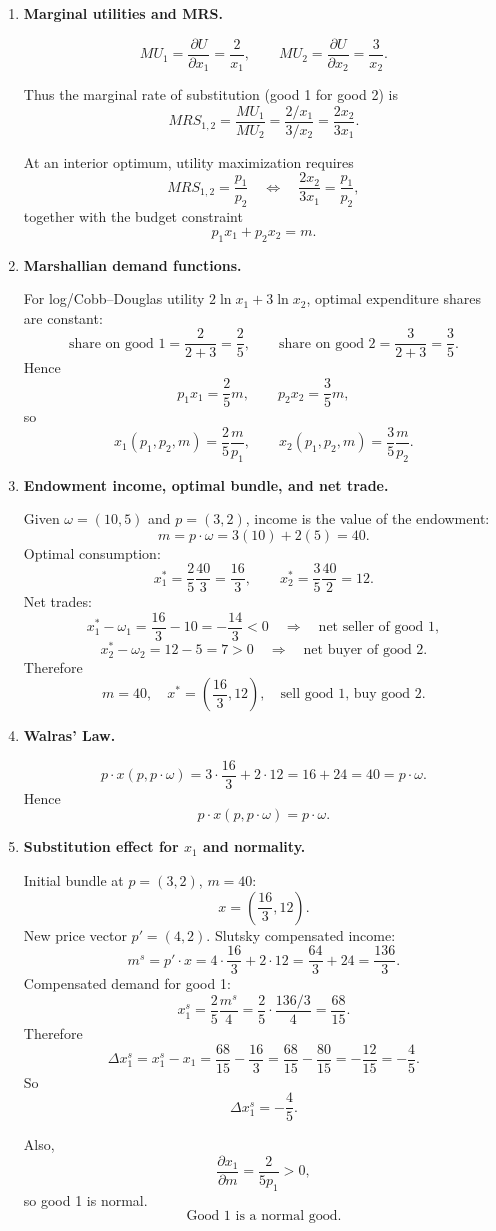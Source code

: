 \documentclass[12pt]{article}
\begin{document}
\begin{enumerate}[label=(\alph*)]
\item \textbf{Marginal utilities and MRS.}

\[
MU_1=\frac{\partial U}{\partial x_1}=\frac{2}{x_1},\qquad
MU_2=\frac{\partial U}{\partial x_2}=\frac{3}{x_2}.
\]

Thus the marginal rate of substitution (good 1 for good 2) is
\[
MRS_{1,2}=\frac{MU_1}{MU_2}
=\frac{2/x_1}{3/x_2}
=\frac{2x_2}{3x_1}.
\]

At an interior optimum, utility maximization requires
\[
\boxed{MRS_{1,2}=\frac{p_1}{p_2}}
\quad\Longleftrightarrow\quad
\boxed{\frac{2x_2}{3x_1}=\frac{p_1}{p_2}},
\]
together with the budget constraint
\[
\boxed{p_1x_1+p_2x_2=m.}
\]

\item \textbf{Marshallian demand functions.}

For log/Cobb--Douglas utility \(2\ln x_1+3\ln x_2\), optimal expenditure shares are constant:
\[
\text{share on good 1}=\frac{2}{2+3}=\frac25,\qquad
\text{share on good 2}=\frac{3}{2+3}=\frac35.
\]
Hence
\[
p_1x_1=\frac25 m,\qquad p_2x_2=\frac35 m,
\]
so
\[
\boxed{x_1(p_1,p_2,m)=\frac{2}{5}\frac{m}{p_1},\qquad
x_2(p_1,p_2,m)=\frac{3}{5}\frac{m}{p_2}.}
\]

\item \textbf{Endowment income, optimal bundle, and net trade.}

Given \(\omega=(10,5)\) and \(p=(3,2)\), income is the value of the endowment:
\[
m=p\cdot\omega=3(10)+2(5)=40.
\]
Optimal consumption:
\[
x_1^*=\frac{2}{5}\frac{40}{3}=\frac{16}{3},\qquad
x_2^*=\frac{3}{5}\frac{40}{2}=12.
\]
Net trades:
\[
x_1^*-\omega_1=\frac{16}{3}-10=-\frac{14}{3}<0
\quad\Rightarrow\quad \text{net seller of good 1},
\]
\[
x_2^*-\omega_2=12-5=7>0
\quad\Rightarrow\quad \text{net buyer of good 2}.
\]
Therefore
\[
\boxed{m=40,\quad x^*=\left(\frac{16}{3},12\right),\quad \text{sell good 1, buy good 2}.}
\]

\item \textbf{Walras' Law.}

\[
p\cdot x(p,p\cdot\omega)
=3\cdot \frac{16}{3}+2\cdot 12
=16+24=40
=p\cdot\omega.
\]
Hence
\[
\boxed{p \cdot x(p,p\cdot \omega)=p\cdot \omega.}
\]

\item \textbf{Substitution effect for \(x_1\) and normality.}

Initial bundle at \(p=(3,2)\), \(m=40\):
\[
x=\left(\frac{16}{3},12\right).
\]
New price vector \(p'=(4,2)\). Slutsky compensated income:
\[
m^s=p'\cdot x
=4\cdot\frac{16}{3}+2\cdot 12
=\frac{64}{3}+24
=\frac{136}{3}.
\]
Compensated demand for good 1:
\[
x_1^s=\frac{2}{5}\frac{m^s}{4}
=\frac{2}{5}\cdot \frac{136/3}{4}
=\frac{68}{15}.
\]
Therefore
\[
\Delta x_1^s=x_1^s-x_1
=\frac{68}{15}-\frac{16}{3}
=\frac{68}{15}-\frac{80}{15}
=-\frac{12}{15}
=-\frac45.
\]
So
\[
\boxed{\Delta x_1^s=-\frac45.}
\]

Also,
\[
\frac{\partial x_1}{\partial m}=\frac{2}{5p_1}>0,
\]
so good 1 is normal.
\[
\boxed{\text{Good 1 is a normal good.}}
\]
\end{enumerate}
\end{document}
